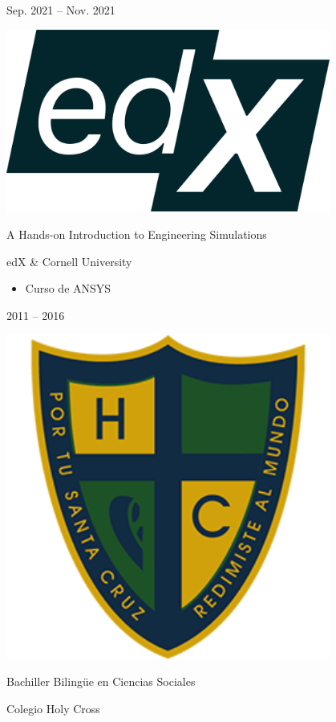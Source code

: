 \documentclass[a4paper,10pt]{article}
\newlength{\cvcolumngapwidth}
\newlength{\cvleftcolumnwidth}
\newlength{\cvrightcolumnwidth}
\newcommand{\cvtitlestyle}[1]{{\large\cvtitlefont\textcolor{cvtitlecolor}{#1}}}
\newcommand{\cvdurationstyle}[1]{{\small\cvdurationfont\textcolor{cvdurationcolor}{#1}}}
\newlength{\cvafteritemskipamount}
\newlength{\cvaftertitleskipamount}
\newlength{\cvparskip}
\newcommand{\cvitem}[2]{
    \begin{minipage}[t]{\cvleftcolumnwidth}
        \raggedleft #1
    \end{minipage}%
    \hspace{\cvcolumngapwidth}%
    \begin{minipage}[t]{\cvrightcolumnwidth}
        \setlength{\parskip}{\cvparskip} #2
    \end{minipage}

    \vspace{\cvafteritemskipamount}
}
\newcommand{\cvtitle}[1]{
    \cvtitlestyle{#1}

    \vspace{\cvaftertitleskipamount}
    \vspace{-\cvparskip}
}
\begin{document}
\cvitem{
    \cvdurationstyle{Sep. 2021 -- Nov. 2021}
}{
    \begin{minipage}{0.1\textwidth}
        \centering
        \includegraphics[width=0.8\textwidth]{../logos-photos/Logo_edx.png}   
    \end{minipage}      
    \cvtitle{A Hands-on Introduction to Engineering Simulations}
    edX \& Cornell University

    \begin{itemize}
        \item Curso de ANSYS
    \end{itemize}
}

\cvitem{
    \cvdurationstyle{2011 -- 2016}
}{
    \begin{minipage}{0.1\textwidth}
        \centering
        \includegraphics[width=0.8\textwidth]{../logos-photos/Logo_HC.png}   
    \end{minipage}  
    \cvtitle{Bachiller Bilingüe en Ciencias Sociales}

    Colegio Holy Cross
}
\end{document}
